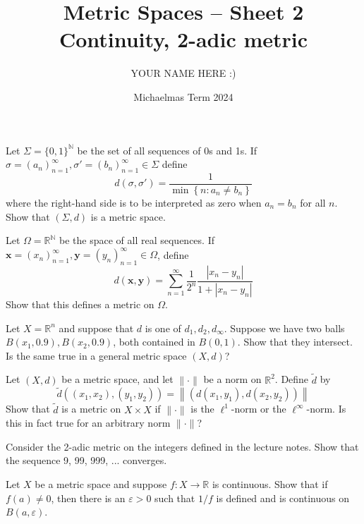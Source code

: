 \documentclass[answers]{exam}
\title{Metric Spaces -- Sheet 2\\Continuity, 2-adic metric}
\author{YOUR NAME HERE :)}
\date{Michaelmas Term 2024}
\begin{document}
\maketitle
\begin{questions}

\question%
Let $\Sigma=\{0,1\}^{\mathbb{N}}$ be the set of all sequences of 0s and 1s. If $\sigma=\left(a_{n}\right)_{n=1}^{\infty}, \sigma'=\left(b_{n}\right)_{n=1}^{\infty} \in \Sigma$ define \[
	d\left(\sigma, \sigma'\right)=\frac{1}{\min \left\{n: a_{n} \neq b_{n}\right\}}
\] where the right-hand side is to be interpreted as zero when $a_{n}=b_{n}$ for all $n$. Show that $(\Sigma, d)$ is a metric space.



\question%
Let $\Omega=\mathbb{R}^{\mathbb{N}}$ be the space of all real sequences. If $\mathbf{x}=\left(x_{n}\right)_{n=1}^{\infty}, \mathbf{y}=\left(y_{n}\right)_{n=1}^{\infty} \in \Omega$, define \[
	d(\mathbf{x}, \mathbf{y})=\sum_{n=1}^{\infty} \frac{1}{2^{n}} \frac{\left|x_{n}-y_{n}\right|}{1+\left|x_{n}-y_{n}\right|}
\] Show that this defines a metric on $\Omega$.



\question%
Let $X=\mathbb{R}^{n}$ and suppose that $d$ is one of $d_{1}, d_{2}, d_{\infty}$. Suppose we have two balls $B\left(x_{1}, 0.9\right), B\left(x_{2}, 0.9\right)$, both contained in $B(0,1)$. Show that they intersect. Is the same true in a general metric space $(X, d)$?



\question%
Let $(X, d)$ be a metric space, and let $\|\cdot\|$ be a norm on $\mathbb{R}^{2}$. Define $\tilde{d}$ by \[
	\tilde{d}\left(\left(x_{1}, x_{2}\right),\left(y_{1}, y_{2}\right)\right)=\left\|\left(d\left(x_{1}, y_{1}\right), d\left(x_{2}, y_{2}\right)\right)\right\|
\] Show that $\tilde{d}$ is a metric on $X \times X$ if $\|\cdot\|$ is the $\ell^{1}$-norm or the $\ell^{\infty}$-norm. Is this in fact true for an arbitrary norm $\|\cdot\|$?



\question%
Consider the 2-adic metric on the integers defined in the lecture notes. Show that the sequence 9, 99, 999, ... converges.



\question%
Let $X$ be a metric space and suppose $f: X \to \mathbb{R}$ is continuous. Show that if $f(a) \neq 0$, then there is an $\varepsilon>0$ such that $1 / f$ is defined and is continuous on $B(a, \varepsilon)$.




\end{questions}
\end{document}
